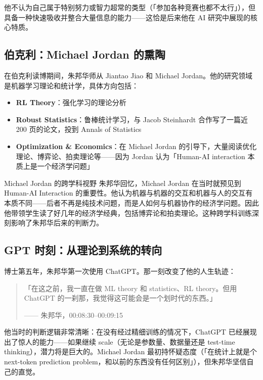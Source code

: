 \documentclass[a4paper]{article}
\begin{document}
他不认为自己属于特别努力或智力超常的类型（「参加各种竞赛也都不太行」），但具备一种快速吸收并整合大量信息的能力——这恰是后来他在 AI 研究中展现的核心特质。

\subsection{伯克利：Michael Jordan 的熏陶}

在伯克利读博期间，朱邦华师从 Jiantao Jiao 和 Michael Jordan。他的研究领域是机器学习理论和统计学，具体方向包括：

\begin{itemize}
\item \textbf{RL Theory}：强化学习的理论分析
\item \textbf{Robust Statistics}：鲁棒统计学习，与 Jacob Steinhardt 合作写了一篇近 200 页的论文，投到 Annals of Statistics
\item \textbf{Optimization \& Economics}：在 Michael Jordan 的引导下，大量阅读优化理论、博弈论、拍卖理论等——因为 Jordan 认为「Human-AI interaction 本质上是一个经济学问题」
\end{itemize}

\begin{knowledgebox}{Michael Jordan 的跨学科视野}
朱邦华回忆，Michael Jordan 在当时就预见到 Human-AI Interaction 的重要性。他认为机器与机器的交互和机器与人的交互有本质不同——后者不再是纯技术问题，而是人如何与机器协作的经济学问题。因此他带领学生读了好几年的经济学经典，包括博弈论和拍卖理论。这种跨学科训练深刻影响了朱邦华后来的判断力。
\end{knowledgebox}

\subsection{GPT 时刻：从理论到系统的转向}

博士第五年，朱邦华第一次使用 ChatGPT。那一刻改变了他的人生轨迹：

\begin{quote}
「在这之前，我一直在做 ML theory 和 statistics、RL theory。但用 ChatGPT 的一刹那，我觉得这可能会是一个划时代的东西。」\par
\hfill —— 朱邦华，00:08:30--00:09:15
\end{quote}

他当时的判断逻辑非常清晰：在没有经过精细训练的情况下，ChatGPT 已经展现出了惊人的能力——如果继续 scale（无论是参数量、数据量还是 test-time thinking），潜力将是巨大的。Michael Jordan 最初持怀疑态度（「在统计上就是个 next-token prediction problem，和以前的东西没有任何区别」），但朱邦华坚信自己的直觉。
\end{document}
